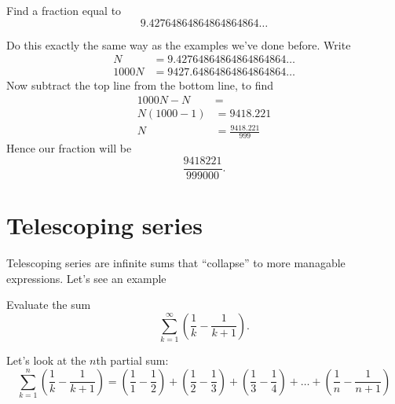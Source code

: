 \documentclass{ximera}
\begin{document}
\begin{example}
  Find a fraction equal to
  \[
  9.42764864864864864864\dots
  \]
  \begin{explanation}
    Do this exactly the same way as the examples we've done
    before. Write
    \begin{align*}
    N &=         9.42764864864864864864\dots\\
    1000 N &= 9427.64864864864864864\dots
    \end{align*}
    Now subtract the top line from the bottom line, to find
    \begin{align*}
      1000N - N &= \\
      N(1000-1) &= 9418.221\\
      N &= \frac{9418.221}{999}
    \end{align*}
    Hence our fraction will be
    \[
    \frac{9418221}{999000}.
    \]
  \end{explanation}
\end{example}



\section{Telescoping series}

Telescoping series are infinite sums that ``collapse'' to more
managable expressions.  Let's see an example

\begin{example}
  Evaluate the sum
  \[
  \sum_{k=1}^\infty\left(\frac{1}{k}-\frac{1}{k+1}\right).
  \]
  \begin{explanation}
    Let's look at the $n$th partial sum:
    \[
    \sum_{k=1}^n\left(\frac{1}{k}-\frac{1}{k+1}\right) =
    \left(\frac{1}{1}-\frac{1}{2}\right) + \left(\frac{1}{2}-\frac{1}{3}\right)+\left(\frac{1}{3}-\frac{1}{4}\right) + \dots + \left(\frac{1}{n}-\frac{1}{n+1}\right)
    \]
    
  \end{explanation}
\end{example}
\end{document}
